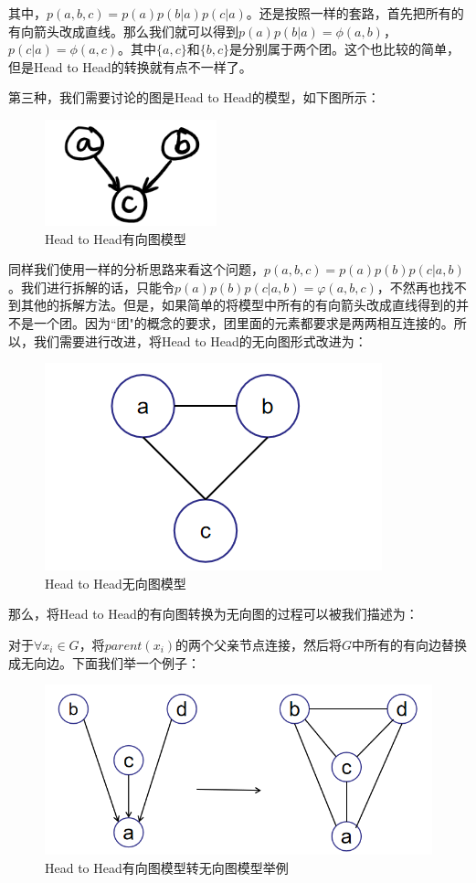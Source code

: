 \documentclass[a4paper]{article}
\begin{document}
其中，$p(a,b,c) = p(a)p(b|a)p(c|a)$。还是按照一样的套路，首先把所有的有向箭头改成直线。那么我们就可以得到$p(a)p(b|a) = \phi(a,b)$，$p(c|a) = \phi(a,c)$。其中$\{a,c\}$和$\{b,c\}$是分别属于两个团。这个也比较的简单，但是Head to Head的转换就有点不一样了。

第三种，我们需要讨论的图是Head to Head的模型，如下图所示：
\begin{figure}[H]
    \centering
    \includegraphics[width=.2\textwidth]{微信图片_20191211153908.png}
    \caption{Head to Head有向图模型}
    
\end{figure}

同样我们使用一样的分析思路来看这个问题，$p(a,b,c) = p(a)p(b)p(c|a,b)$。我们进行拆解的话，只能令$p(a)p(b)p(c|a,b) = \varphi(a,b,c)$，不然再也找不到其他的拆解方法。但是，如果简单的将模型中所有的有向箭头改成直线得到的并不是一个团。因为``团"的概念的要求，团里面的元素都要求是两两相互连接的。所以，我们需要进行改进，将Head to Head的无向图形式改进为：
\begin{figure}[H]
    \centering
    \includegraphics[width=.3\textwidth]{微信图片_20191211155130.png}
    \caption{Head to Head无向图模型}
    
\end{figure}

那么，将Head to Head的有向图转换为无向图的过程可以被我们描述为：

对于$\forall x_i \in G$，将$parent(x_i)$的两个父亲节点连接，然后将$G$中所有的有向边替换成无向边。下面我们举一个例子：
\begin{figure}[H]
    \centering
    \includegraphics[width=.5\textwidth]{微信图片_20191211160601.png}
    \caption{Head to Head有向图模型转无向图模型举例}
    
\end{figure}
\end{document}
